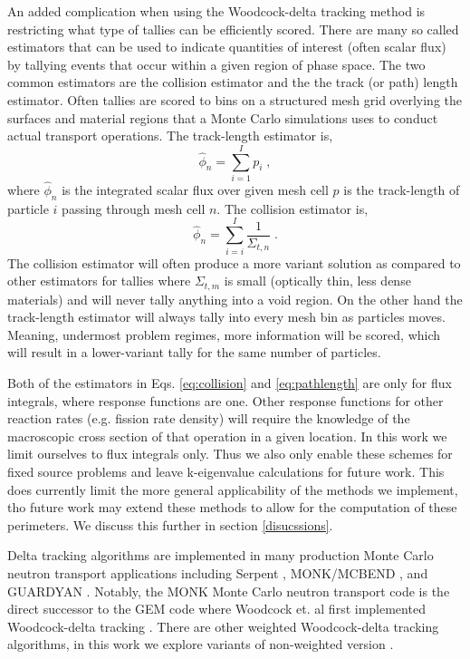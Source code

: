 An added complication when using the Woodcock-delta tracking method is restricting what type of tallies can be efficiently scored.
There are many so called estimators that can be used to indicate quantities of interest (often scalar flux) by tallying events that occur within a given region of phase space.
The two common estimators are the collision estimator and the the track (or path) length estimator.
Often tallies are scored to bins on a structured mesh grid overlying the surfaces and material regions that a Monte Carlo simulations uses to conduct actual transport operations.
The track-length estimator is,
\begin{equation}
    \label{eq:pathlength}
    \hat{\phi}_n = \sum_{i=1}^{I}p_i \; ,
\end{equation}
where $\hat{\phi}_n$ is the integrated scalar flux over given mesh cell $p$ is the track-length of particle $i$ passing through mesh cell $n$.
The collision estimator is,
\begin{equation}
    \label{eq:collision}
    \hat{\phi}_n = \sum_{i=i}^{I} \frac{1}{\Sigma_{t,n}} \;.
\end{equation}
The collision estimator will often produce a more variant solution as compared to other estimators for tallies where $\Sigma_{t,m}$ is small (optically thin, less dense materials) and will never tally anything into a void region.
On the other hand the track-length estimator will always tally into every mesh bin as particles moves.
Meaning, undermost problem regimes, more information will be scored, which will result in a lower-variant tally for the same number of particles.

Both of the estimators in Eqs. \ref{eq:collision} and \ref{eq:pathlength} are only for flux integrals, where response functions are one.
Other response functions for other reaction rates (e.g. fission rate density) will require the knowledge of the macroscopic cross section of that operation in a given location.
In this work we limit ourselves to flux integrals only.
Thus we also only enable these schemes for fixed source problems and leave k-eigenvalue calculations for future work.
This does currently limit the more general applicability of the methods we implement, tho future work may extend these methods to allow for the computation of these perimeters.
We discuss this further in section \ref{disucssions}.

Delta tracking algorithms are implemented in many production Monte Carlo neutron transport applications including Serpent \cite{leppanen_2010_burnup, leppanen_use_2017, leppanen_development_2013, leppanen_2015_serpent}, MONK/MCBEND \cite{richards_monk_2015}, and GUARDYAN \cite{molnar_gpu_based_2019}.
Notably, the MONK Monte Carlo neutron transport code is the direct successor to the GEM code where Woodcock et. al first implemented Woodcock-delta tracking \cite{woodcock_techniques_1965}.
There are other weighted Woodcock-delta tracking algorithms, in this work we explore variants of non-weighted version \cite{molnar_variance_2018, morgan_weighted-delta-tracking_2015}.

